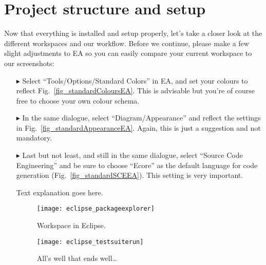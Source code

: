 \section{Project structure and setup}
Now that everything is installed and setup properly, let's take a closer look at the different workspaces and our workflow.
Before we continue, please make a few slight adjustments to EA so you can easily compare your current workspace to our screenshots:
\begin{enumerate} 

\item[$\blacktriangleright$] Select ``Tools/Options/Standard Colors'' in EA, and set your colours to reflect Fig.~\ref{fig_standardColoursEA}.
This is advisable but you're of course free to choose your own colour schema.

\item[$\blacktriangleright$] In the same dialogue, select ``Diagram/Appearance'' and reflect the settings in Fig.~\ref{fig_standardAppearanceEA}.
Again, this is just a suggestion and not mandatory.

\item[$\blacktriangleright$] Last but not least, and still in the same dialogue, select ``Source Code Engineering'' and be sure to choose ``Ecore'' as the default language for code generation (Fig.~\ref{fig_standardSCEEA}). This setting is very important.

\newpage
\texHeader
Text explanation goes here.
\pagebreak

\visHeader

\begin{figure}[htbp]
	\centering
  \texttt{[image: eclipse\_packageexplorer]}
	\caption{Workspace in Eclipse.}
	\label{fig_eclipsepackageexplorer}
\end{figure}

\begin{figure}[b!]
	\centering
  \texttt{[image: eclipse\_testsuiterun]}
	\caption{All's well that ends well\ldots}
	\label{fig_eclipsetestsuiterun}
\end{figure}



\end{enumerate}
